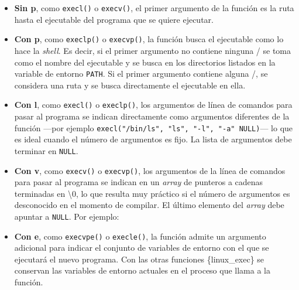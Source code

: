 \begin{itemize}
\item
  \textbf{Sin \textquotesingle p\textquotesingle{}}, como
  \texttt{execl()} o \texttt{execv()}, el primer argumento de la función
  es la ruta hasta el ejecutable del programa que se quiere ejecutar.
\item
  \textbf{Con \textquotesingle p\textquotesingle{}}, como
  \texttt{execlp()} o \texttt{execvp()}, la función busca el ejecutable
  como lo hace la \emph{shell}. Es decir, si el primer argumento no
  contiene ninguna \textquotesingle/\textquotesingle{} se toma como el
  nombre del ejecutable y se busca en los directorios listados en la
  variable de entorno \texttt{PATH}. Si el primer argumento contiene
  alguna \textquotesingle/\textquotesingle, se considera una ruta y se
  busca directamente el ejecutable en ella.
\item
  \textbf{Con \textquotesingle l\textquotesingle{}}, como
  \texttt{execl()} o \texttt{execlp()}, los argumentos de línea de
  comandos para pasar al programa se indican directamente como
  argumentos diferentes de la función ---por ejemplo
  \texttt{execl("/bin/ls",\ "ls",\ "-l",\ "-a"\ NULL)}--- lo que es
  ideal cuando el número de argumentos es fijo. La lista de argumentos
  debe terminar en \texttt{NULL}.
\item
  \textbf{Con \textquotesingle v\textquotesingle{}}, como
  \texttt{execv()} o \texttt{execvp()}, los argumentos de la línea de
  comandos para pasar al programa se indican en un \emph{array} de
  punteros a cadenas terminadas en
  \textquotesingle\textbackslash0\textquotesingle, lo que resulta muy
  práctico si el número de argumentos es desconocido en el momento de
  compilar. El último elemento del \emph{array} debe apuntar a
  \texttt{NULL}. Por ejemplo:

\begin{Shaded}
\begin{Highlighting}[]
\OperatorTok{*}\OperatorTok{[]} \OperatorTok{=} \OperatorTok{\{} \OperatorTok{,} \OperatorTok{,} \OperatorTok{,}\OperatorTok{\};}
\OperatorTok{(}\OperatorTok{,}\OperatorTok{);}
\end{Highlighting}
\end{Shaded}
\item
  \textbf{Con \textquotesingle e\textquotesingle{}}, como
  \texttt{execvpe()} o \texttt{execle()}, la función admite un argumento
  adicional para indicar el conjunto de variables de entorno con el que
  se ejecutará el nuevo programa. Con las otras funciones
  \{linux\_exec\} se conservan las variables de entorno actuales en el
  proceso que llama a la función.
\end{itemize}

